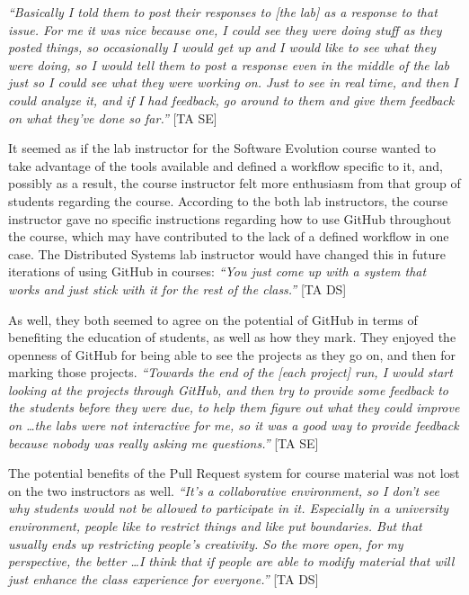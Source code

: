 \textit{``Basically I told them to post their responses to [the lab] as a response to that issue. For me it was nice because one, I could see they were doing stuff as they posted things, so occasionally I would get up and I would like to see what they were doing, so I would tell them to post a response even in the middle of the lab just so I could see what they were working on. Just to see in real time, and then I could analyze it, and if I had feedback, go around to them and give them feedback on what they've done so far.''} [TA SE]

It seemed as if the lab instructor for the Software Evolution course wanted to take advantage of the tools available and defined a workflow specific to it, and, possibly as a result, the course instructor felt more enthusiasm from that group of students regarding the course. According to the both lab instructors, the course instructor gave no specific instructions regarding how to use GitHub throughout the course, which may have contributed to the lack of a defined workflow in one case. The Distributed Systems lab instructor would have changed this in future iterations of using GitHub in courses: \textit{``You just come up with a system that works and just stick with it for the rest of the class.''} [TA DS]

As well, they both seemed to agree on the potential of GitHub in terms of benefiting the education of students, as well as how they mark. They enjoyed the openness of GitHub for being able to see the projects as they go on, and then for marking those projects. \textit{``Towards the end of the [each project] run, I would start looking at the projects through GitHub, and then try to provide some feedback to the students before they were due, to help them figure out what they could improve on \ldots the labs were not interactive for me, so it was a good way to provide feedback because nobody was really asking me questions.''} [TA SE]

The potential benefits of the Pull Request system for course material was not lost on the two instructors as well. \textit{``It's a collaborative environment, so I don't see why students would not be allowed to participate in it. Especially in a university environment, people like to restrict things and like put boundaries. But that usually ends up restricting people's creativity. So the more open, for my perspective, the better \ldots I think that if people are able to modify material that will just enhance the class experience for everyone.''} [TA DS]

